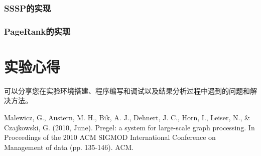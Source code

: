 \documentclass{ML}
\begin{document}
\subsubsection{SSSP的实现}
\subsubsection{PageRank的实现}
\section{实验心得}
可以分享您在实验环境搭建、程序编写和调试以及结果分析过程中遇到的问题和解决方法。
\appendix

\begin{thebibliography}{20}
     Malewicz, G., Austern, M. H., Bik, A. J., Dehnert, J. C., Horn, I., Leiser, N., \& Czajkowski, G. (2010, June). Pregel: a system for large-scale graph processing. In Proceedings of the 2010 ACM SIGMOD International Conference on Management of data (pp. 135-146). ACM.
\end{thebibliography}
\end{document}
